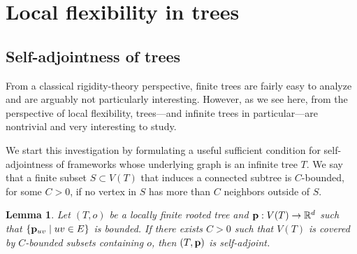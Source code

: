 \documentclass[reqno,english]{amsart}
\numberwithin{equation}{section}
\newtheorem{lemma}[theorem]{Lemma}
\theoremstyle{definition}{
\newtheorem{example}[theorem]{Example}
\newtheorem{definition}[theorem]{Definition}
\newtheorem*{definition*}{Definition}
\newtheorem{problem}[theorem]{Problem}
\newtheorem{question}[theorem]{Question}
}
\newcommand{\R}{\mathbb R}
\newcommand{\p}{{\bf p}}
\begin{document}
\section{Local flexibility in trees}\label{sec:trees}
\subsection{Self-adjointness of trees}
From a classical rigidity-theory perspective, finite trees are fairly easy to analyze and are arguably not particularly interesting. However, as we see here, from the perspective of local flexibility, trees---and infinite trees in particular---are nontrivial and very interesting to study. 

We start this investigation by formulating a useful sufficient condition for self-adjointness of frameworks whose underlying graph 
is an infinite tree $T$. We say that a finite subset $S\subset V(T)$ that induces a connected subtree is $C$-bounded, for some $C>0$, if no vertex in $S$ has more than $C$ neighbors outside of $S$.
\begin{lemma}\label{lem:tree_self_adjoint}
    Let $(T,o)$ be a locally finite rooted tree and $\p:V(T)\to\R^d$ such that $\{\p_{uv}\mid uv\in E\}$ is bounded. If there exists $C>0$ such that $V(T)$ is covered by $C$-bounded subsets containing $o$, then $(T,\p)$ is self-adjoint.
\end{lemma} 
\end{document}
